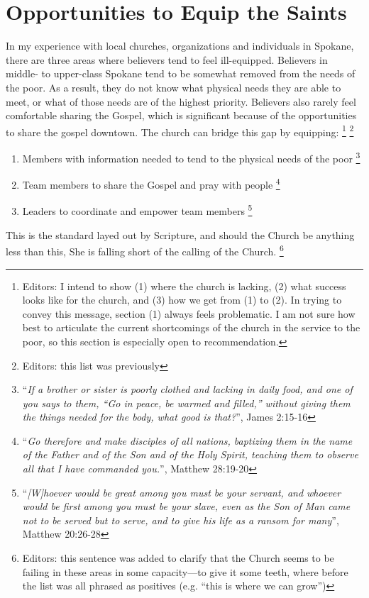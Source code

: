 \documentclass[12pt]{article}
\begin{document}
\section{Opportunities to Equip the Saints}

    In my experience with local churches, organizations and individuals in Spokane, there are three areas where believers tend to feel ill-equipped.
    Believers in middle- to upper-class Spokane tend to be somewhat removed from the needs of the poor.
    As a result, they do not know what physical needs they are able to meet, or what of those needs are of the highest priority.
    Believers also rarely feel comfortable sharing the Gospel, which is significant because of the opportunities to share the gospel downtown.
    The church can bridge this gap by equipping:
    \footnote{Editors: I intend to show (1) where the church is lacking, (2) what success looks like for the church, and (3) how we get from (1) to (2).
    In trying to convey this message, section (1) always feels problematic.
    I am not sure how best to articulate the current shortcomings of the church in the service to the poor, so this section is especially open to recommendation.}
    \footnote{Editors: this list was previously }
    \begin{enumerate}
        \item Members with information needed to tend to the physical needs of the poor
          \footnote{``\textit{If a brother or sister is poorly clothed and lacking in daily food, and one of you says to them, “Go in peace, be warmed and filled,” without giving them the things needed for the body, what good is that?}'', James 2:15-16}
        \item Team members to share the Gospel and pray with people
          \footnote{``\textit{Go therefore and make disciples of all nations, baptizing them in the name of the Father and of the Son and of the Holy Spirit, teaching them to observe all that I have commanded you.}'', Matthew 28:19-20}
        \item Leaders to coordinate and empower team members
          \footnote{``\textit{[W]hoever would be great among you must be your servant, and whoever would be first among you must be your slave, even as the Son of Man came not to be served but to serve, and to give his life as a ransom for many}'', Matthew 20:26-28}
    \end{enumerate}
    This is the standard layed out by Scripture, and should the Church be anything less than this, She is falling short of the calling of the Church.
    \footnote{Editors: this sentence was added to clarify that the Church seems to be failing in these areas in some capacity---to give it some teeth, where before the list was all phrased as positives (e.g. ``this is where we can grow'')}
\end{document}
